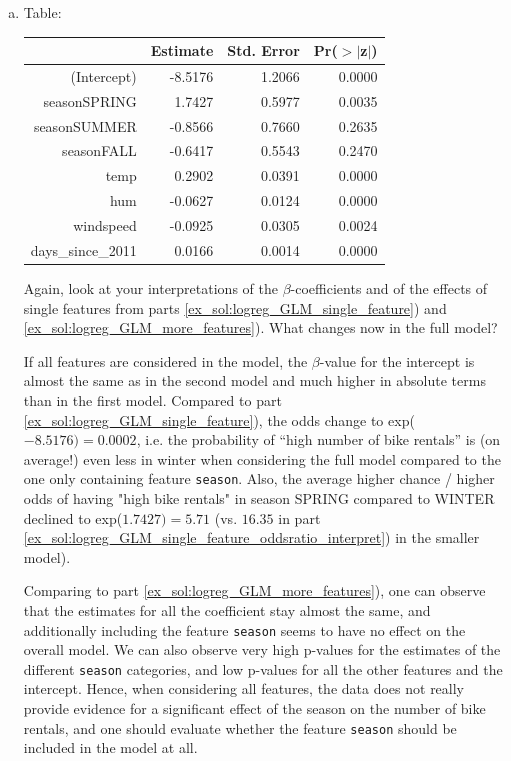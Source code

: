 {\begin{enumerate}[a)]
	\item Table:	
	\begin{table}[ht]
		\centering
		\begin{tabular}{rrrr}
			\hline
			& Estimate & Std. Error & Pr($>$$|$z$|$) \\ 
			\hline
			(Intercept) & -8.5176 & 1.2066 & 0.0000 \\ 
			seasonSPRING & 1.7427 & 0.5977 & 0.0035 \\ 
			seasonSUMMER & -0.8566 & 0.7660 & 0.2635 \\ 
			seasonFALL & -0.6417 & 0.5543 & 0.2470 \\ 
			temp & 0.2902 & 0.0391 & 0.0000 \\ 
			hum & -0.0627 & 0.0124 & 0.0000 \\ 
			windspeed & -0.0925 & 0.0305 & 0.0024 \\ 
			days\_since\_2011 & 0.0166 & 0.0014 & 0.0000 \\ 
			\hline
		\end{tabular}
	\end{table}

    Again, look at your interpretations of the \(\beta\)-coefficients and of the effects of single features from parts \ref{ex_sol:logreg_GLM_single_feature}) and \ref{ex_sol:logreg_GLM_more_features}).
    What changes now in the full model?
	
	If all features are considered in the model, the $\beta$-value for the intercept is almost the same as in the second model and much higher in absolute terms than in the first model.
    Compared to part \ref{ex_sol:logreg_GLM_single_feature}), the odds change to exp($-8.5176) = 0.0002$, i.e. the probability of ``high number of bike rentals'' is (on average!) even less in winter when considering the full model compared to the one only containing feature \texttt{season}. Also, the average higher chance / higher odds of having "high bike rentals" in season SPRING compared to WINTER declined to exp($1.7427)=5.71$ (vs. $16.35$ in part \ref{ex_sol:logreg_GLM_single_feature_oddsratio_interpret}) in the smaller model).

    Comparing to part \ref{ex_sol:logreg_GLM_more_features}), one can observe that the estimates for all the coefficient stay almost the same, and additionally including the feature \texttt{season} seems to have no effect on the overall model.
    We can also observe very high p-values for the estimates of the different \texttt{season} categories, and low p-values for all the other features and the intercept.
    Hence, when considering all features, the data does not really provide evidence for a significant effect of the season on the number of bike rentals, and one should evaluate whether the feature \texttt{season} should be included in the model at all.
    

\end{enumerate}}
